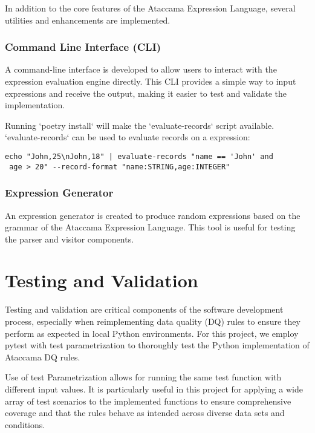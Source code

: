 In addition to the core features of the Ataccama Expression Language, several utilities and enhancements are implemented.

\subsubsection{Command Line Interface (CLI)}

A command-line interface is developed to allow users to interact with the expression evaluation engine directly. This CLI provides a simple way to input expressions and receive the output, making it easier to test and validate the implementation.

Running `poetry install` will make the `evaluate-records` script available.
`evaluate-records` can be used to evaluate records on a expression:

\begin{verbatim}
echo "John,25\nJohn,18" | evaluate-records "name == 'John' and
 age > 20" --record-format "name:STRING,age:INTEGER"
\end{verbatim}

\subsubsection{Expression Generator}

An expression generator is created to produce random expressions based on the grammar of the Ataccama Expression Language. This tool is useful for testing the parser and visitor components.

\section{Testing and Validation}

Testing and validation are critical components of the software development process, especially when reimplementing data quality (DQ) rules to ensure they perform as expected in local Python environments. For this project, we employ pytest with test parametrization to thoroughly test the Python implementation of Ataccama DQ rules.


Use of test Parametrization allows for running the same test function with different input values. It is particularly useful in this project for applying a wide array of test scenarios to the implemented functions to ensure comprehensive coverage and that the rules behave as intended across diverse data sets and conditions.

